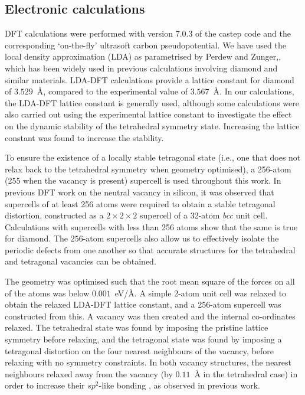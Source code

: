 \documentclass[aps,showpacs,prb,reprint,superscriptaddress,longbibliography]{revtex4-1}
\begin{document}
\subsection{Electronic calculations}

DFT calculations were performed with version 7.0.3 of the {\sc castep}
code\cite{clark_first_2005} and the corresponding `on-the-fly'
ultrasoft carbon pseudopotential.\cite{vanderbilt_soft_1990} We have
used the local density approximation (LDA) as parametrised by Perdew
and Zunger,\cite{perdew_self-interaction_1981}, which has been widely
used in previous calculations involving diamond and similar
materials.\cite{al-mushadani_free-energy_2003,corsetti_system-size_2011,probert_improving_2003,kunc_equation_2003,maezono_equation_2007}
LDA-DFT calculations provide a lattice constant for
diamond\cite{jones_density_2015} of $3.529$~\r{A}, compared to the
experimental value of
$3.567$~\r{A}.\cite{madelung_semiconductors_1996} In our calculations,
the LDA-DFT lattice constant is generally used, although some
calculations were also carried out using the experimental lattice
constant to investigate the effect on the dynamic stability of the
tetrahedral symmetry state. Increasing the lattice constant was found
to increase the stability.

To ensure the existence of a locally stable tetragonal state (i.e.,
one that does not relax back to the tetrahedral symmetry when geometry
optimised), a 256-atom (255 when the vacancy is present) supercell is
used throughout this work.  In previous DFT work on the neutral
vacancy in silicon, it was observed that supercells of at least 256
atoms were required to obtain a stable tetragonal
distortion,\cite{corsetti_system-size_2011,probert_improving_2003}
constructed as a $2\times2\times2$ supercell of a 32-atom \textit{bcc}
unit cell.  Calculations with supercells with less than 256 atoms show
that the same is true for diamond.  The $256$-atom supercells also
allow us to effectively isolate the periodic defects from one another
so that accurate structures for the tetrahedral and tetragonal
vacancies can be obtained.

The geometry was optimised such that the root mean square of the
forces on all of the atoms was below $0.001$~eV/\r{A}. A simple 2-atom
unit cell was relaxed to obtain the relaxed LDA-DFT lattice constant,
and a 256-atom supercell was constructed from this. A vacancy was then
created and the internal co-ordinates relaxed.  The tetrahedral state
was found by imposing the pristine lattice symmetry before relaxing,
and the tetragonal state was found by imposing a tetragonal distortion
on the four nearest neighbours of the vacancy, before relaxing with no
symmetry constraints. In both vacancy structures, the nearest
neighbours relaxed away from the vacancy (by $0.11$~\r{A} in the
tetrahedral case) in order to increase their ${sp}^2$-like bonding ,
as observed in previous work.\cite{breuer_ab_1995}
\end{document}
